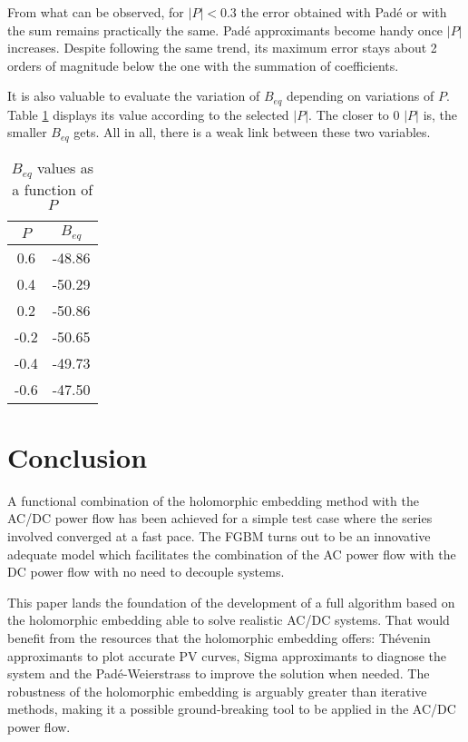 \documentclass[conference]{IEEEtran}
\begin{document}
From what can be observed, for $|P|<0.3$ the error obtained with Padé or with the sum remains practically the same. Padé approximants become handy once $|P|$ increases. Despite following the same trend, its maximum error stays about 2 orders of magnitude below the one with the summation of coefficients.

It is also valuable to evaluate the variation of $B_{eq}$ depending on variations of $P$. Table \ref{tab:2} displays its value according to the selected $|P|$. The closer to 0 $|P|$ is, the smaller $B_{eq}$ gets. All in all, there is a weak link between these two variables.

\begin{table}[!ht]
  \renewcommand{\arraystretch}{1.0}
  \caption{$B_{eq}$ values as a function of $P$}
  \label{tab:2}
  \centering
  \begin{tabular}{cc}
  \hline
  $P$ & $B_{eq}$\\
  \hline
  0.6 & -48.86\\
  0.4 & -50.29\\
  0.2 & -50.86\\
  -0.2 & -50.65\\
  -0.4 & -49.73\\
  -0.6 & -47.50\\
  \hline
  \end{tabular}
  \end{table}

\section{Conclusion}\label{secConcl}
A functional combination of the holomorphic embedding method with the AC/DC power flow has been achieved for a simple test case where the series involved converged at a fast pace. The FGBM turns out to be an innovative adequate model which facilitates the combination of the AC power flow with the DC power flow with no need to decouple systems. 

This paper lands the foundation of the development of a full algorithm based on the holomorphic embedding able to solve realistic AC/DC systems. That would benefit from the resources that the holomorphic embedding offers: Thévenin approximants to plot accurate PV curves, Sigma approximants to diagnose the system and the Padé-Weierstrass to improve the solution when needed. The robustness of the holomorphic embedding is arguably greater than iterative methods, making it a possible ground-breaking tool to be applied in the AC/DC power flow.
\end{document}
